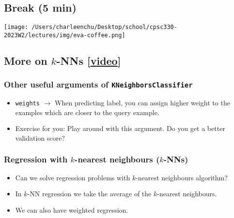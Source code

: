 \documentclass[11pt]{article}
\providecommand{\tightlist}{%
      \setlength{\itemsep}{0pt}\setlength{\parskip}{0pt}}
\begin{document}
    \subsection{Break (5 min)}\label{break-5-min}

\texttt{[image: /Users/charleenchu/Desktop/school/cpsc330-2023W2/lectures/img/eva-coffee.png]}

    

    \subsection{\texorpdfstring{More on \(k\)-NNs
{[}\href{https://youtu.be/IRGbqi5S9gQ}{video}{]}}{More on k-NNs {[}video{]}}}\label{more-on-k-nns-video}

    \subsubsection{\texorpdfstring{Other useful arguments of
\texttt{KNeighborsClassifier}}{Other useful arguments of KNeighborsClassifier}}\label{other-useful-arguments-of-kneighborsclassifier}

\begin{itemize}
\tightlist
\item
  \texttt{weights} \(\rightarrow\) When predicting label, you can assign
  higher weight to the examples which are closer to the query example.\\
\item
  Exercise for you: Play around with this argument. Do you get a better
  validation score?
\end{itemize}

    \subsubsection{\texorpdfstring{Regression with \(k\)-nearest neighbours
(\(k\)-NNs)}{Regression with k-nearest neighbours (k-NNs)}}\label{regression-with-k-nearest-neighbours-k-nns}

\begin{itemize}
\tightlist
\item
  Can we solve regression problems with \(k\)-nearest neighbours
  algorithm?
\item
  In \(k\)-NN regression we take the average of the \(k\)-nearest
  neighbours.
\item
  We can also have weighted regression.
\end{itemize}
\end{document}
